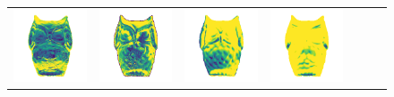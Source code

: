 \begin{figure}
\begin{tabular*}{\linewidth}{@{}c@{}c@{}c@{}c@{}c@{}c@{}c@{}}
\includegraphics[width=\reswidth\linewidth]{figures/results/examples/yu_owlie_errors.png} &
\includegraphics[width=\reswidth\linewidth]{figures/results/examples/dpsn_owlie_errors.png} &
\includegraphics[width=\reswidth\linewidth]{figures/results/examples/marrnet_owlie_errors.png} &
\includegraphics[width=\reswidth\linewidth]{figures/results/examples/ef_owlie_errors.png} \\


\end{tabular*}
\end{figure}
